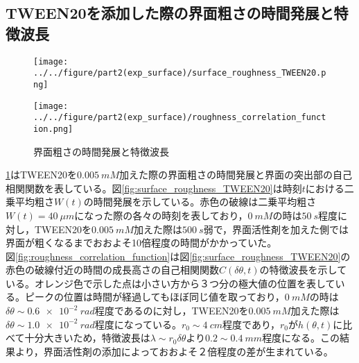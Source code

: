 \documentclass[autodetect-engine,dvi=dvipdfmx,a4paper,ja=standard,oneside,openany,11pt,draft]{bxjsbook}
\begin{document}
\subsection{TWEEN20を添加した際の界面粗さの時間発展と特徴波長}
\begin{figure}[H]
  \begin{minipage}{0.5\hsize}
    \centering
    \texttt{[image: ../../figure/part2(exp\_surface)/surface\_roughness\_TWEEN20.png]}
    \label{fig:surface_roughness_TWEEN20}
  \end{minipage}
  \begin{minipage}{0.5\hsize}
    \centering
    \texttt{[image: ../../figure/part2(exp\_surface)/roughness\_correlation\_function.png]}
    \label{fig:roughness_correlation_function}
  \end{minipage}
  \caption{界面粗さの時間発展と特徴波長}
  \label{fig:surface_roughness}
\end{figure}
\ref{fig:surface_roughness}はTWEEN20を$\SI{0.005}{mM}$加えた際の界面粗さの時間発展と界面の突出部の自己相関関数を表している。図\ref{fig:surface_roughness_TWEEN20}は時刻$t$における二乗平均粗さ$W(t)$の時間発展を示している。赤色の破線は二乗平均粗さ$W(t)=\SI{40}{\mu m}$になった際の各々の時刻を表しており，$\SI{0}{mM}$の時は$\SI{50}{s}$程度に対し，TWEEN20を$\SI{0.005}{mM}$加えた際は$\SI{500}{s}$弱で，界面活性剤を加えた側では界面が粗くなるまでおおよそ10倍程度の時間がかかっていた。\\
図\ref{fig:roughness_correlation_function}は図\ref{fig:surface_roughness_TWEEN20}の赤色の破線付近の時間の成長高さの自己相関関数$C(\delta\theta,t)$の特徴波長を示している。オレンジ色で示した点は小さい方から３つ分の極大値の位置を表している。ピークの位置は時間が経過してもほぼ同じ値を取っており，$\SI{0}{mM}$の時は$\delta\theta\sim\SI{0.6e-2}{rad}$程度であるのに対し，TWEEN20を$\SI{0.005}{mM}$加えた際は$\delta\theta\sim\SI{1.0e-2}{rad}$程度になっている。$r_0\sim\SI{4}{cm}$程度であり，$r_0$が$h(\theta,t)$に比べて十分大きいため，特徴波長は$\lambda\sim r_0\delta\theta$より$0.2\sim\SI{0.4}{mm}$程度になる。この結果より，界面活性剤の添加によっておおよそ２倍程度の差が生まれている。\\
\end{document}
